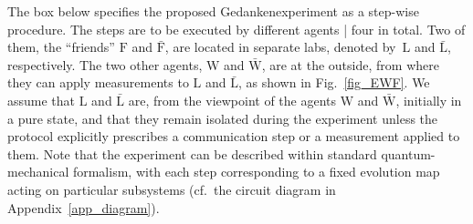 \documentclass{article}
\theoremstyle{mystyle}
\theoremstyle{definition}
\newcommand*{\Friendone}{\mathrm{\bar{F}}}
\newcommand*{\Friendtwo}{\mathrm{F}}
\newcommand*{\Labone}{\mathrm{\bar{L}}}
\newcommand*{\Labtwo}{\mathrm{L}}
\newcommand*{\Assistant}{\mathrm{\bar{W}}}
\newcommand*{\Wigner}{\mathrm{W}}
\begin{document}
The box below specifies the proposed Gedankenexperiment as a step-wise procedure. The steps are to be executed by different agents | four in total. Two of them, the ``friends'' $\Friendtwo$ and $\Friendone$, are located in  separate labs, denoted by~$\Labtwo$ and $\Labone$, respectively. The two other agents, $\Wigner$ and $\Assistant$, are at the outside, from where they can apply measurements to $\Labtwo$ and $\Labone$, as shown in Fig.~\ref{fig_EWF}. We assume that $\Labtwo$ and $\Labone$ are, from the viewpoint of the agents $\Wigner$ and $\Assistant$, initially in a pure state, and that they remain isolated during the experiment unless the  protocol explicitly prescribes a communication step or a measurement applied to them. Note that the experiment can be described within standard quantum-mechanical formalism, with each step  corresponding to a fixed evolution map acting on particular subsystems (cf.\ the circuit diagram in Appendix~\ref{app_diagram}).
\end{document}
